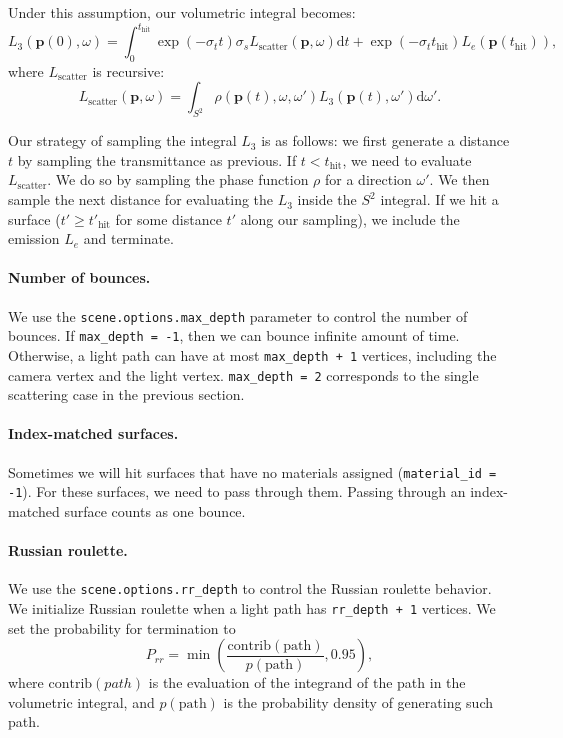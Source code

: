 Under this assumption, our volumetric integral becomes:
\begin{equation}
L_3(\mathbf{p}(0), \omega) = \int_{0}^{t_{\text{hit}}} \exp\left(-\sigma_t t \right) \sigma_s L_{\text{scatter}}(\mathbf{p}, \omega) \mathrm{d}t + \exp\left(-\sigma_t t_{\text{hit}} \right) L_e(\mathbf{p}(t_{\text{hit}})),
\label{eq:rte_multiple_scattering_integral_form}
\end{equation}
where $L_{\text{scatter}}$ is recursive:
\begin{equation}
L_{\text{scatter}}(\mathbf{p}, \omega) = \int_{S^2} \rho(\mathbf{p}(t), \omega, \omega') L_3(\mathbf{p}(t), \omega') \mathrm{d}\omega'.
\end{equation}

Our strategy of sampling the integral $L_3$ is as follows: we first generate a distance $t$ by sampling the transmittance as previous. If $t < t_{\text{hit}}$, we need to evaluate $L_{\text{scatter}}$. We do so by sampling the phase function $\rho$ for a direction $\omega'$. We then sample the next distance for evaluating the $L_3$ inside the $S^2$ integral. If we hit a surface ($t' \geq t'_{\text{hit}}$ for some distance $t'$ along our sampling), we include the emission $L_e$ and terminate.

\paragraph{Number of bounces.} We use the \lstinline{scene.options.max_depth} parameter to control the number of bounces. If \lstinline{max_depth = -1}, then we can bounce infinite amount of time. Otherwise, a light path can have at most \lstinline{max_depth + 1} vertices, including the camera vertex and the light vertex. \lstinline{max_depth = 2} corresponds to the single scattering case in the previous section.

\paragraph{Index-matched surfaces.} Sometimes we will hit surfaces that have no materials assigned (\lstinline{material_id = -1}). For these surfaces, we need to pass through them. Passing through an index-matched surface counts as one bounce.

\paragraph{Russian roulette.} We use the \lstinline{scene.options.rr_depth} to control the Russian roulette behavior. We initialize Russian roulette when a light path has \lstinline{rr_depth + 1} vertices. We set the probability for termination to
\begin{equation}
P_{rr} = \min\left(\frac{\text{contrib}(\text{path})}{p(\text{path})}, 0.95\right),
\end{equation}
where $\text{contrib}(path)$ is the evaluation of the integrand of the path in the volumetric integral, and $p(\text{path})$ is the probability density of generating such path.

